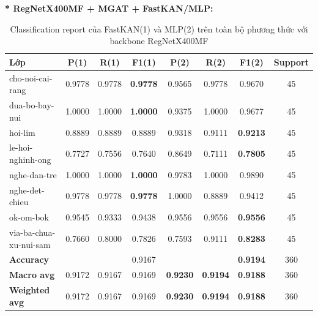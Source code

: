 \textbf{* RegNetX400MF + MGAT + FastKAN/MLP:}
\begin{table}[H]
\centering
\renewcommand{\arraystretch}{1.08}
\caption{\centering Classification report của FastKAN(1) và MLP(2) trên toàn bộ phương thức với backbone RegNetX400MF}
\begin{tabular}{lccccccc}
\hline
\textbf{Lớp} &
\textbf{P(1)} & \textbf{R(1)} & \textbf{F1(1)} &
\textbf{P(2)} & \textbf{R(2)} & \textbf{F1(2)} &
\textbf{Support} \\
\hline

cho-noi-cai-rang
& 0.9778 & 0.9778 & \textbf{0.9778}
& 0.9565 & 0.9778 & 0.9670 & 45 \\

dua-bo-bay-nui
& 1.0000 & 1.0000 & \textbf{1.0000}
& 0.9375 & 1.0000 & 0.9677 & 45 \\

hoi-lim
& 0.8889 & 0.8889 & 0.8889
& 0.9318 & 0.9111 & \textbf{0.9213} & 45 \\

le-hoi-nghinh-ong
& 0.7727 & 0.7556 & 0.7640
& 0.8649 & 0.7111 & \textbf{0.7805} & 45 \\

nghe-dan-tre
& 1.0000 & 1.0000 & \textbf{1.0000}
& 0.9783 & 1.0000 & 0.9890 & 45 \\

nghe-det-chieu
& 0.9778 & 0.9778 & \textbf{0.9778}
& 1.0000 & 0.8889 & 0.9412 & 45 \\

ok-om-bok
& 0.9545 & 0.9333 & 0.9438
& 0.9556 & 0.9556 & \textbf{0.9556} & 45 \\

via-ba-chua-xu-nui-sam
& 0.7660 & 0.8000 & 0.7826
& 0.7593 & 0.9111 & \textbf{0.8283} & 45 \\
\hline

\textbf{Accuracy}
& & & 0.9167
& & & \textbf{0.9194} & 360 \\

\textbf{Macro avg}
& 0.9172 & 0.9167 & 0.9169
& \textbf{0.9230} & \textbf{0.9194} & \textbf{0.9188} & 360 \\

\textbf{Weighted avg}
& 0.9172 & 0.9167 & 0.9169
& \textbf{0.9230} & \textbf{0.9194} & \textbf{0.9188} & 360 \\
\hline
\end{tabular}
\end{table}
